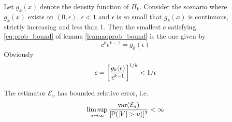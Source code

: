 \documentclass{article}
\begin{document}
\begin{remark}\label{remark:inf_c}
  Let $g_k(x)$ denote the density function of $\Pi_k$. Consider the
  scenario where $g_k(x)$ exists on $(0, \epsilon)$, $\epsilon < 1$
  and $\epsilon$ is so small that $g_k(x)$ is continuous, strictly
  increasing and less than 1. Then the smallest $c$ satisfying
  \eqref{eq:prob_bound} of lemma \ref{lemma:prob_bound} is the one
  given by
  \[
  c^k \epsilon^{k-1} = g_k(\epsilon)
  \]
  Obviously
  \[
  c = \left[
    {g_k(\epsilon) \over \epsilon^{k-1}}
  \right]^{1/k} < 1/\epsilon
  \]
\end{remark}

\begin{theorem}
  The estimator $\mathcal E_u$ has bounded relative error, i.e.
  \begin{equation*}
    \limsup_{u \to \infty} {\text{var}(\mathcal E_u) \over [\mathbb{P}(|V| > u)]^2} < \infty
  \end{equation*}
\end{theorem}
\end{document}
